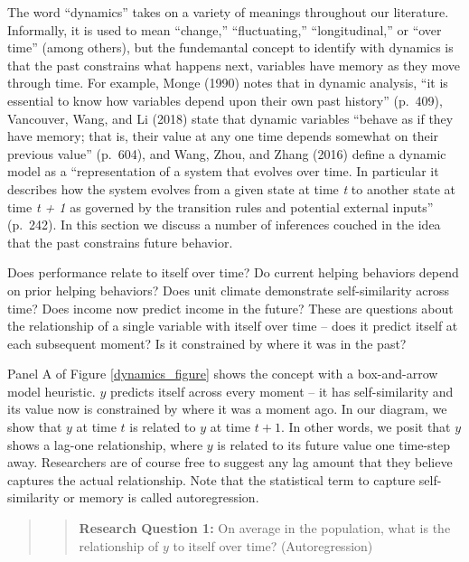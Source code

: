 \documentclass[english,,man]{apa6}
\theoremstyle{definition}
\theoremstyle{definition}
\theoremstyle{definition}
\theoremstyle{remark}
\begin{document}
The word \enquote{dynamics} takes on a variety of meanings throughout
our literature. Informally, it is used to mean \enquote{change,}
\enquote{fluctuating,} \enquote{longitudinal,} or \enquote{over time}
(among others), but the fundemantal concept to identify with dynamics is
that the past constrains what happens next, variables have memory as
they move through time. For example, Monge (1990) notes that in dynamic
analysis, \enquote{it is essential to know how variables depend upon
their own past history} (p.~409), Vancouver, Wang, and Li (2018) state
that dynamic variables \enquote{behave as if they have memory; that is,
their value at any one time depends somewhat on their previous value}
(p.~604), and Wang, Zhou, and Zhang (2016) define a dynamic model as a
\enquote{representation of a system that evolves over time. In
particular it describes how the system evolves from a given state at
time \emph{t} to another state at time \emph{t + 1} as governed by the
transition rules and potential external inputs} (p.~242). In this
section we discuss a number of inferences couched in the idea that the
past constrains future behavior.

Does performance relate to itself over time? Do current helping
behaviors depend on prior helping behaviors? Does unit climate
demonstrate self-similarity across time? Does income now predict income
in the future? These are questions about the relationship of a single
variable with itself over time -- does it predict itself at each
subsequent moment? Is it constrained by where it was in the past?

Panel A of Figure \ref{dynamics_figure} shows the concept with a
box-and-arrow model heuristic. \(y\) predicts itself across every moment
-- it has self-similarity and its value now is constrained by where it
was a moment ago. In our diagram, we show that \(y\) at time \(t\) is
related to \(y\) at time \(t + 1\). In other words, we posit that \(y\)
shows a lag-one relationship, where \(y\) is related to its future value
one time-step away. Researchers are of course free to suggest any lag
amount that they believe captures the actual relationship. Note that the
statistical term to capture self-similarity or memory is called
autoregression.

\begin{quote}
\begin{quote}
\textbf{Research Question 1:} On average in the population, what is the
relationship of \(y\) to itself over time? (Autoregression)
\end{quote}
\end{quote}
\end{document}
